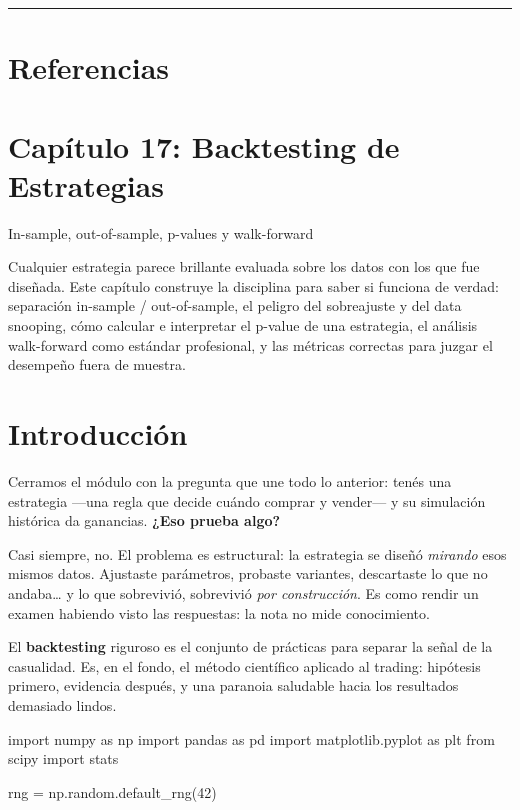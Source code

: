 \documentclass[
  spanish,
  letterpaper,
  DIV=11,
  numbers=noendperiod]{scrreprt}
\newenvironment{Shaded}{\begin{snugshade}}{\end{snugshade}}
\newcommand{\DecValTok}[1]{\textcolor[rgb]{0.68,0.00,0.00}{#1}}
\newcommand{\ImportTok}[1]{\textcolor[rgb]{0.00,0.46,0.62}{#1}}
\newcommand{\NormalTok}[1]{\textcolor[rgb]{0.00,0.23,0.31}{#1}}
\newcommand{\OperatorTok}[1]{\textcolor[rgb]{0.37,0.37,0.37}{#1}}
\begin{document}
\begin{center}\rule{0.5\linewidth}{0.5pt}\end{center}

\chapter{Referencias}\label{referencias-15}

\label{refs}

\chapter{Capítulo 17: Backtesting de
Estrategias}\label{capuxedtulo-17-backtesting-de-estrategias}

In-sample, out-of-sample, p-values y walk-forward

Cualquier estrategia parece brillante evaluada sobre los datos con los
que fue diseñada. Este capítulo construye la disciplina para saber si
funciona de verdad: separación in-sample / out-of-sample, el peligro del
sobreajuste y del data snooping, cómo calcular e interpretar el p-value
de una estrategia, el análisis walk-forward como estándar profesional, y
las métricas correctas para juzgar el desempeño fuera de muestra.

\hfill\break

\chapter{Introducción}\label{introducciuxf3n-14}

Cerramos el módulo con la pregunta que une todo lo anterior: tenés una
estrategia ---una regla que decide cuándo comprar y vender--- y su
simulación histórica da ganancias. \textbf{¿Eso prueba algo?}

Casi siempre, no. El problema es estructural: la estrategia se diseñó
\emph{mirando} esos mismos datos. Ajustaste parámetros, probaste
variantes, descartaste lo que no andaba\ldots{} y lo que sobrevivió,
sobrevivió \emph{por construcción}. Es como rendir un examen habiendo
visto las respuestas: la nota no mide conocimiento.

El \textbf{backtesting} riguroso es el conjunto de prácticas para
separar la señal de la casualidad. Es, en el fondo, el método científico
aplicado al trading: hipótesis primero, evidencia después, y una
paranoia saludable hacia los resultados demasiado lindos.

\label{setup}
\begin{Shaded}
\begin{Highlighting}[]
\ImportTok{import}\NormalTok{ numpy }\ImportTok{as}\NormalTok{ np}
\ImportTok{import}\NormalTok{ pandas }\ImportTok{as}\NormalTok{ pd}
\ImportTok{import}\NormalTok{ matplotlib.pyplot }\ImportTok{as}\NormalTok{ plt}
\ImportTok{from}\NormalTok{ scipy }\ImportTok{import}\NormalTok{ stats}

\NormalTok{rng }\OperatorTok{=}\NormalTok{ np.random.default\_rng(}\DecValTok{42}\NormalTok{)}
\end{Highlighting}
\end{Shaded}
\end{document}
